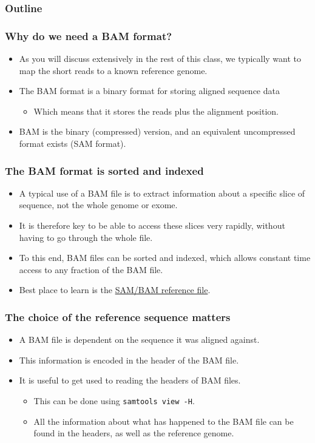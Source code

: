 \documentclass{beamer}
\begin{document}
\begin{frame}
  \frametitle{Outline}
  \tableofcontents[currentsection]
\end{frame}

\begin{frame}
  \frametitle{Why do we need a BAM format?}
  \begin{itemize}
  \item As you will discuss extensively in the rest of this class, we typically want to map the short reads to a known reference genome.
  \item The BAM format is a binary format for storing aligned sequence data
    \begin{itemize}
    \item Which means that it stores the reads plus the alignment position.
    \end{itemize}
  \item BAM is the binary (compressed) version, and an equivalent uncompressed format exists (SAM format).
  \end{itemize}
\end{frame}



\begin{frame}
  \frametitle{The BAM format is sorted and indexed}
  \begin{itemize}
  \item A typical use of a BAM file is to extract information about a specific slice of sequence, not the whole genome or exome.
  \item It is therefore key to be able to access these slices very rapidly, without having to go through the whole file.
  \item To this end, BAM files can be sorted and indexed, which allows constant time access to any fraction of the BAM file.
  \item Best place to learn is the \href{http://samtools.sourceforge.net/SAMv1.pdf}{SAM/BAM reference file}.
  \end{itemize}
\end{frame}


\begin{frame}
  \frametitle{The choice of the reference sequence matters}
  \begin{itemize}
  \item A BAM file is dependent on the sequence it was aligned against.
  \item This information is encoded in the header of the BAM file.
  \item It is useful to get used to reading the headers of BAM files.
    \begin{itemize}
    \item This can be done using \texttt{samtools view -H}.
    \item All the information about what has happened to the BAM file can be found in the headers, as well as the reference genome.
    \end{itemize}
  \end{itemize}
\end{frame}
\end{document}
